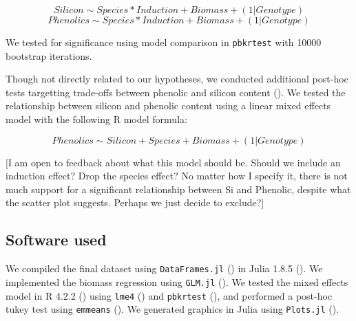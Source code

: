 \documentclass[12pt, letterpaper, ]{report}
\begin{document}
\[Silicon \sim Species * Induction + Biomass + (1|Genotype)\]
\[Phenolics \sim Species * Induction + Biomass + (1|Genotype)\]

We tested for significance using model comparison in \verb|pbkrtest| with 10000 bootstrap iterations. 

Though not directly related to our hypotheses, we conducted additional post-hoc tests targetting trade-offs between phenolic and silicon content (\cite{simpson_still_2017}). We tested the relationship between silicon and phenolic content using a linear mixed effects model with the following R model formula:

\[Phenolics \sim Silicon + Species + Biomass + (1|Genotype)\]

[I am open to feedback about what this model should be. Should we include an induction effect? Drop the species effect? No matter how I specify it, there is not much support for a significant relationship between Si and Phenolic, despite what the scatter plot suggests. Perhaps we just decide to exclude?]



\subsection{Software used}

We compiled the final dataset using \verb|DataFrames.jl| (\cite{bogumil_kaminski_2023_7632427}) in Julia 1.8.5 (\cite{bezanson2017julia}). We implemented the biomass regression using \verb|GLM.jl| (\cite{douglas_bates_2023_7529836}). We tested the mixed effects model in R 4.2.2 (\cite{r_core_team_2022}) using \verb|lme4| (\cite{lme4_bates_2015}) and \verb|pbkrtest| (\cite{halekoh_pbkrtest_2014}), and performed a post-hoc tukey test using \verb|emmeans| (\cite{lenth_2023_emmeans}). We generated graphics in Julia using \verb|Plots.jl| (\cite{tom_breloff_2023_7736124}). 
\end{document}
